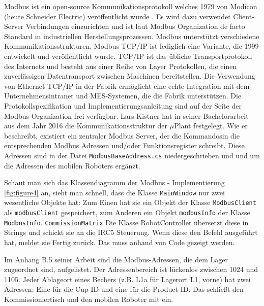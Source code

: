 Modbus ist ein open-source Kommunikationsprotokoll welches 1979 von Modicon (heute Schneider Electric) veröffentlicht wurde \cite{ModbusOrg}.
Es wird dazu verwendet Client-Server Verbindungen einzurichten und ist laut Modbus Organization de facto Standard in
industriellen Herstellungsprozessen.
Modbus unterstützt verschiedene Kommunikationsstrukturen.
Modbus TCP/IP ist lediglich eine Variante, die 1999 entwickelt und veröffentlicht wurde.
TCP/IP ist das übliche Transportprotokoll des Internets und besteht aus einer Reihe von Layer Protokollen, die einen
zuverlässigen Datentransport zwischen Maschinen bereitstellen.
Die Verwendung von Ethernet TCP/IP in der Fabrik ermöglicht eine echte Integration mit dem Unternehmensintranet und
MES-Systemen, die die Fabrik unterstützen.
Die Protokollspezifikation und Implementierungsanleitung sind auf der Seite der Modbus Organization frei verfügbar.
\newline
\newline
Lars Kistner \cite{LarsKistner2017} hat in seiner Bachelorarbeit aus dem Jahr 2016 die Kommunikationsstruktur der $\mu$Plant
festgelegt.
Wie er beschreibt, existiert ein zentraler Modbus Server, der die \glqq Kommandos\grqq in die entsprechenden Modbus
Adressen und/oder Funktionsregister schreibt.
Diese Adressen sind in der Datei \verb|ModbusBaseAddress.cs| niedergeschrieben und und um die Adressen des mobilen Roboters
ergänzt.

Schaut man sich das Klassendiagramm der Modbus - Implementierung \ref{fig:figure4} an, sieht man schnell, dass die
Klasse \verb|MainWindow| nur zwei wesentliche Objekte hat:
Zum Einen hat sie ein Objekt der Klasse \verb|ModbusClient| als \verb|modbusClient| gespeichert, zum Anderen ein Objekt
\verb|modbusInfo| der Klasse \verb|ModbusInfo|.
\verb|CommissionMatrix|
Die Klasse RobotController übersetzt diese in Strings und schickt sie an die IRC5 Steuerung.
Wenn diese den Befehl ausgeführt hat, meldet sie \glqq Fertig \grqq zurück.
Das muss anhand von Code gezeigt werden.

Im Anhang B.5 seiner Arbeit sind die Modbus-Adressen, die dem Lager zugeordnet sind, aufgelistet.
Der Adressenbereich ist lückenlos zwischen 1024 und 1105.
Jeder Ablageort eines Bechers (z.B. L1a für Lagerort L1, vorne) hat zwei Adressen: Eine für die Cup ID und eine
für die Product ID.
Das schließt den Kommissioniertisch und den mobilen Roboter mit ein.

